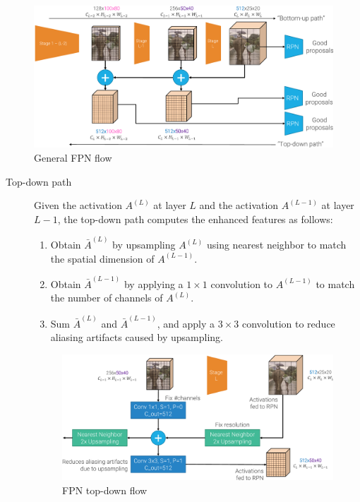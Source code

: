 \begin{description}
        \begin{figure}[H]
            \centering
            \includegraphics[width=0.7\linewidth]{./img/_fpn_flow.pdf}
            \caption{General FPN flow}
        \end{figure}

        \begin{description}
            \item[Top-down path] 
                Given the activation $A^{(L)}$ at layer $L$ and the activation $A^{(L-1)}$ at layer $L-1$, the top-down path computes the enhanced features as follows:
                \begin{enumerate}
                    \item Obtain $\bar{A}^{(L)}$ by upsampling $A^{(L)}$ using nearest neighbor to match the spatial dimension of $A^{(L-1)}$.
                    \item Obtain $\bar{A}^{(L-1)}$ by applying a $1 \times 1$ convolution to $A^{(L-1)}$ to match the number of channels of $A^{(L)}$.
                    \item Sum $\bar{A}^{(L)}$ and $\bar{A}^{(L-1)}$, and apply a $3 \times 3$ convolution to reduce aliasing artifacts caused by upsampling.
                \end{enumerate}

                \begin{figure}[H]
                    \centering
                    \includegraphics[width=0.65\linewidth]{./img/_fpn_top_down.pdf}
                    \caption{FPN top-down flow}
                \end{figure}
        \end{description}


\end{description}
